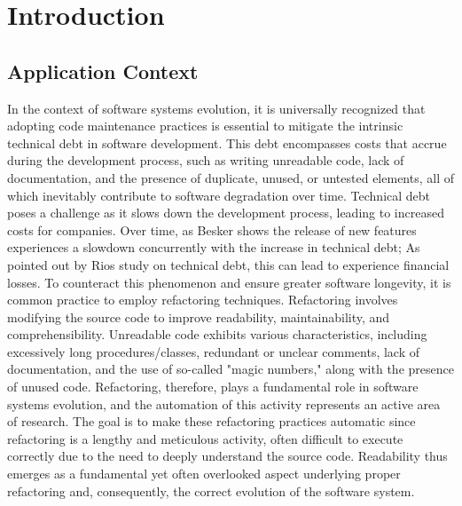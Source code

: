 \chapter{Introduction}
\label{Chapter1}

\section{Application Context}
In the context of software systems evolution, it is universally recognized that adopting code maintenance practices is essential to mitigate the intrinsic technical debt in software development. This debt encompasses costs that accrue during the development process, such as writing unreadable code, lack of documentation, and the presence of duplicate, unused, or untested elements, all of which inevitably contribute to software degradation over time. Technical debt poses a challenge as it slows down the development process, leading to increased costs for companies. Over time, as Besker \etal \cite{Besker2018} shows the release of new features experiences a slowdown concurrently with the increase in technical debt; As pointed out by Rios \etal \cite{Rios2018} study on technical debt, this can lead to experience financial losses. To counteract this phenomenon and ensure greater software longevity, it is common practice to employ refactoring techniques. Refactoring involves modifying the source code to improve readability, maintainability, and comprehensibility. Unreadable code exhibits various characteristics, including excessively long procedures/classes, redundant or unclear comments, lack of documentation, and the use of so-called "magic numbers," along with the presence of unused code. Refactoring, therefore, plays a fundamental role in software systems evolution, and the automation of this activity represents an active area of research. The goal is to make these refactoring practices automatic since refactoring is a lengthy and meticulous activity, often difficult to execute correctly due to the need to deeply understand the source code. Readability thus emerges as a fundamental yet often overlooked aspect underlying proper refactoring and, consequently, the correct evolution of the software system.


